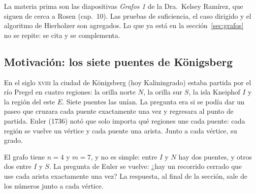 \documentclass[11pt,letterpaper]{article}
\begin{document}
La materia prima son las diapositivas \textit{Grafos 1} de la
Dra.\ Kelsey Ramírez, que siguen de cerca a Rosen (cap.\ 10). Las
pruebas de suficiencia, el caso dirigido y el algoritmo de Hierholzer
son agregados. Lo que ya está en la sección~\ref{sec:grafos} no se
repite: se cita y se complementa.


\subsection*{Motivación: los siete puentes de Königsberg}

En el siglo \textsc{xviii} la ciudad de Königsberg (hoy Kaliningrado)
estaba partida por el río Pregel en cuatro regiones: la orilla norte
$N$, la orilla sur $S$, la isla Kneiphof $I$ y la región del este
$E$. Siete puentes las unían. La pregunta era si se podía dar un paseo
que cruzara cada puente exactamente una vez y regresara al punto de
partida. Euler (1736) notó que solo importa qué regiones une cada
puente: cada región se vuelve un vértice y cada puente una arista.
Junto a cada vértice, su grado.

\begin{center}
\end{center}

El grafo tiene $n = 4$ y $m = 7$, y no es simple: entre $I$ y $N$ hay
dos puentes, y otros dos entre $I$ y $S$. La pregunta de Euler se
vuelve: ¿hay un recorrido cerrado que use cada arista exactamente una
vez? La respuesta, al final de la sección, sale de los números junto a
cada vértice.

\end{document}
